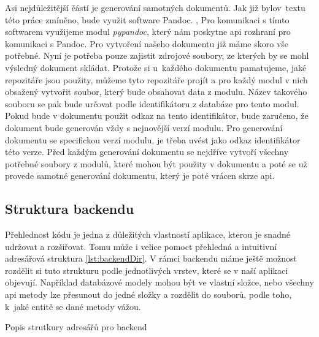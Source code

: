 Asi nejdůležitější částí je generování samotných dokumentů. Jak již bylo\linebreak v~textu této práce zmíněno, bude využit software Pandoc. \cite{pandocSW}, Pro komunikaci s tímto 
softwarem využijeme modul \textit{pypandoc}, který nám poskytne \gls{api} rozhraní pro komunikaci s Pandoc. Pro vytvoření našeho dokumentu již máme skoro vše potřebné. Nyní
je potřeba pouze zajistit zdrojové soubory, ze kterých by se mohl výsledný dokument skládat. Protože si u~každého dokumentu pamatujeme, jaké repozitáře jsou použity, můžeme
tyto repozitáře projít a pro každý modul v nich obsažený vytvořit soubor, který bude obsahovat data z modulu. Název takového souboru se pak bude určovat podle identifikátoru
z databáze pro tento modul. Pokud bude v dokumentu použit odkaz na tento identifikátor, bude zaručeno, že dokument bude generován vždy s nejnovější verzí modulu. Pro generování
dokumentu se specifickou verzí modulu, je třeba uvést jako odkaz identifikátor této verze. Před každým generování dokumentu se nejdříve vytvoří všechny potřebné soubory z modulů,
které mohou být použity v dokumentu a poté se už provede samotné generování dokumentu, který je poté vrácen skrze \gls{api}.

\clearpage

\subsection{Struktura backendu}

Přehlednost kódu je jedna z důležitých vlastností aplikace, kterou je snadné udržovat a rozšiřovat. Tomu může i velice pomoct přehledná a intuitivní
adresářová struktura \ref{lst:backendDir}.
V rámci backendu máme ještě možnost rozdělit si tuto strukturu podle jednotlivých vrstev, které se v naší aplikaci objevují. Napří\-klad databázové modely mohou být ve vlastní složce,
nebo všechny \gls{api} metody lze přesunout do jedné složky a rozdělit do souborů, podle toho, k~jaké entitě se dané metody vážou.

\begin{listing}[H]
    \caption{Popis strutkury adresářů pro backend}
    \label{lst:backendDir}
\end{listing}

